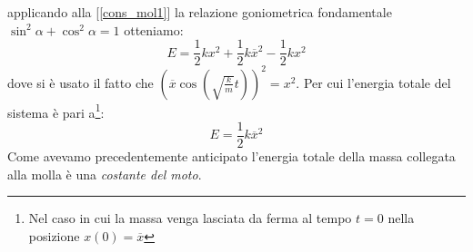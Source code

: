 \documentclass[a4paper,10pt,oneside]{article}
\begin{document}
applicando alla [\ref{cons_mol1}] la relazione goniometrica fondamentale $\sin^2 \alpha+\cos^2\alpha=1$ otteniamo:
\begin{equation}
 E=\frac 1 2 kx^2+\frac1 2 k\overline x^2-\frac 1 2 kx^2
\end{equation}
dove si è usato il fatto che $\left(\overline x \cos( \sqrt{\frac k m}t)\right)^2=x^2$. Per cui l'energia totale del sistema è pari a\footnote{Nel caso in cui la massa venga lasciata da ferma al tempo $t=0$ nella posizione $x(0)=\overline x$}:
                                                                                                                                     \begin{equation}                                                                                                                                   E=\frac 1 2 k\overline x^2                                                                                                                                    \end{equation}
Come avevamo precedentemente anticipato l'energia totale della massa collegata alla molla è una \emph{costante del moto}.





 
\end{document}
